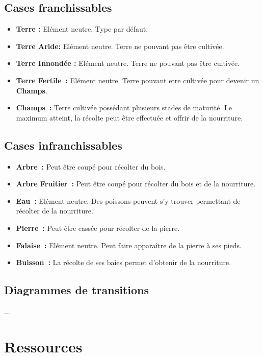 \documentclass[a4paper]{article}
\begin{document}
\subsection*{Cases franchissables}
\begin{itemize}
\item \textbf{Terre :} \small{ Elément neutre. Type par défaut.}
\item \textbf{Terre Aride:} \small{ Elément neutre. Terre ne pouvant pas être cultivée.}
\item \textbf{Terre Innondée :} \small{ Elément neutre. Terre ne pouvant pas être cultivée.}
\item \textbf{Terre Fertile :} \small{ Elément neutre. Terre pouvant etre cultivée pour devenir un \textbf{Champs}.}
\item \textbf{Champs :} \small{ Terre cultivée possédant plusieurs stades de maturité. Le maximum atteint, la récolte peut être effectuée et offrir de la nourriture.}
\end{itemize}

\subsection*{Cases infranchissables}
\begin{itemize}
\item \textbf{Arbre :} \small{ Peut être coupé pour récolter du bois.}
\item \textbf{Arbre Fruitier :} \small{ Peut être coupé pour récolter du bois et de la nourriture.}
\item \textbf{Eau :} \small{ Elément neutre. Des poissons peuvent s'y trouver permettant de récolter de la nourriture.}
\item \textbf{Pierre :} \small{ Peut être cassée pour récolter de la pierre.}
\item \textbf{Falaise :} \small{ Elément neutre. Peut faire apparaître de la pierre à ses pieds.}
\item \textbf{Buisson :} \small{ La récolte de ses baies permet d'obtenir de la nourriture.}
\end{itemize}

\subsection*{Diagrammes de transitions}
...


\section*{Ressources}
\end{document}
